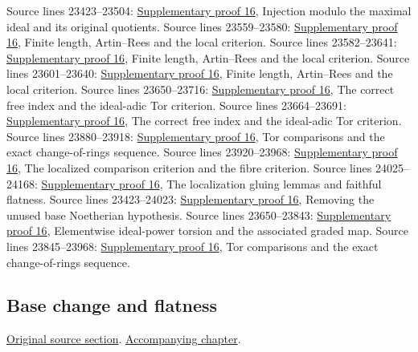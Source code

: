 \begin{AlgebraSourceRoutes}
 Source lines 23423--23504: \hyperlink{algebra_flatness_criteria_notes_20260928}{Supplementary proof 16}, Injection modulo the maximal ideal and its original quotients.
 Source lines 23559--23580: \hyperlink{algebra_flatness_criteria_notes_20260928}{Supplementary proof 16}, Finite length, Artin--Rees and the local criterion.
 Source lines 23582--23641: \hyperlink{algebra_flatness_criteria_notes_20260928}{Supplementary proof 16}, Finite length, Artin--Rees and the local criterion.
 Source lines 23601--23640: \hyperlink{algebra_flatness_criteria_notes_20260928}{Supplementary proof 16}, Finite length, Artin--Rees and the local criterion.
 Source lines 23650--23716: \hyperlink{algebra_flatness_criteria_notes_20260928}{Supplementary proof 16}, The correct free index and the ideal-adic Tor criterion.
 Source lines 23664--23691: \hyperlink{algebra_flatness_criteria_notes_20260928}{Supplementary proof 16}, The correct free index and the ideal-adic Tor criterion.
 Source lines 23880--23918: \hyperlink{algebra_flatness_criteria_notes_20260928}{Supplementary proof 16}, Tor comparisons and the exact change-of-rings sequence.
 Source lines 23920--23968: \hyperlink{algebra_flatness_criteria_notes_20260928}{Supplementary proof 16}, The localized comparison criterion and the fibre criterion.
 Source lines 24025--24168: \hyperlink{algebra_flatness_criteria_notes_20260928}{Supplementary proof 16}, The localization gluing lemmas and faithful flatness.
 Source lines 23423--24023: \hyperlink{algebra_flatness_criteria_notes_20260928}{Supplementary proof 16}, Removing the unused base Noetherian hypothesis.
 Source lines 23650--23843: \hyperlink{algebra_flatness_criteria_notes_20260928}{Supplementary proof 16}, Elementwise ideal-power torsion and the associated graded map.
 Source lines 23845--23968: \hyperlink{algebra_flatness_criteria_notes_20260928}{Supplementary proof 16}, Tor comparisons and the exact change-of-rings sequence.
\end{AlgebraSourceRoutes}

\subsection{Base change and flatness}
\hypertarget{algebra-source-section-base-change-flat}{}
\noindent\href{https://github.com/stacks/stacks-project/blob/a04446e57ec1fbc252a871afcec7752fb2807b14/algebra.tex\#L24177}{Original source section}. \href{algebra.pdf\#nameddest=section-base-change-flat}{Accompanying chapter}.

